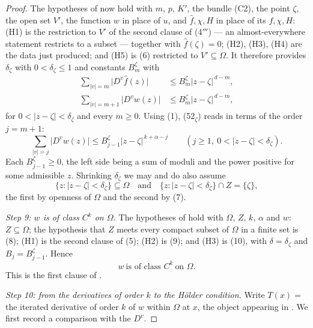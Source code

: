 \begin{proof}
The hypotheses of  now hold with $m$, $p$, $K'$, the
bundle (C2), the point $\zeta$, the open set $V'$, the function $w$ in place of
$u$, and $\hat f,\chi,H$ in place of its $f,\chi,H$: (H1) is the restriction to
$V'$ of the second clause of (4$'''$) --- an almost-everywhere statement
restricts to a subset --- together with $\hat f(\zeta)=0$; (H2), (H3), (H4) are
the data just produced; and (H5) is (6) restricted to $V'\subseteq\Omega$.  It therefore provides $\delta_\zeta$ with
$0<\delta_\zeta\le1$ and constants $B^{\zeta}_m$ with
\begin{align}
  \sum_{|v|=m}\bigl|D^{v}\hat f(z)\bigr|
    &\le B^{\zeta}_m|z-\zeta|^{\,d-m},\tag{51$_\zeta$}\\
  \sum_{|v|=m+1}\bigl|D^{v}w(z)\bigr|
    &\le B^{\zeta}_m|z-\zeta|^{\,d-m},\tag{52$_\zeta$}
\end{align}
for $0<|z-\zeta|<\delta_\zeta$ and every $m\ge0$.  Using (1), (52$_\zeta$) reads
in terms of the order $j=m+1$:
\begin{equation}\tag{10}
  \sum_{|v|=j}\bigl|D^{v}w(z)\bigr|\le B^{\zeta}_{j-1}|z-\zeta|^{\,k+\alpha-j}
  \qquad(j\ge1,\ 0<|z-\zeta|<\delta_\zeta).
\end{equation}
Each $B^{\zeta}_{j-1}\ge0$, the left side being a sum of moduli and the power
positive for some admissible $z$.  Shrinking $\delta_\zeta$ we may and do also
assume
\begin{equation}\tag{11}
  \{z:|z-\zeta|<\delta_\zeta\}\subseteq\Omega
  \quad\text{and}\quad
  \{z:|z-\zeta|<\delta_\zeta\}\cap Z=\{\zeta\},
\end{equation}
the first by openness of $\Omega$ and the second by (7).

\emph{Step 9: $w$ is of class $C^{k}$ on $\Omega$.}  The hypotheses of
 hold with $\Omega$, $Z$, $k$, $\alpha$ and $w$:
$Z\subseteq\Omega$; the hypothesis that $Z$ meets every compact subset of
$\Omega$ in a finite set is (8); (H1) is the second clause
of (5); (H2) is (9); and (H3) is (10), with $\delta=\delta_\zeta$ and
$B_j=B^{\zeta}_{j-1}$.  Hence
\begin{equation}\tag{12}
  w\ \text{is of class }C^{k}\ \text{on }\Omega .
\end{equation}
This is the first clause of .

\emph{Step 10: from the derivatives of order $k$ to the H\"older condition.}
Write $T(x)=$ the iterated derivative of order $k$ of $w$ within $\Omega$ at
$x$, the object appearing in .  We first record a
comparison with the $D^{v}$.


\end{proof}
